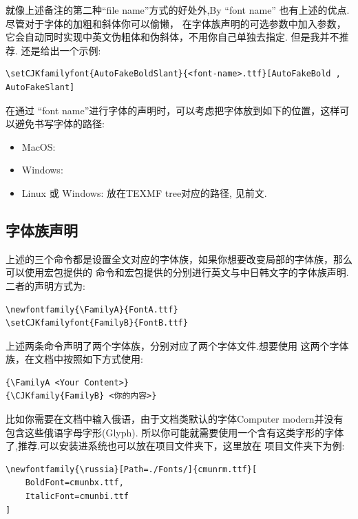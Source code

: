 \begin{remark}%
就像上述备注的第二种``file name''方式的好处外,By ``font name'' 也有上述的优点. 尽管对于字体的加粗和斜体你可以偷懒，
在字体族声明的可选参数中加入参数，它会自动同时实现中英文伪粗体和伪斜体，不用你自己单独去指定.
但是我并不推荐. 还是给出一个示例:
\end{remark}

\begin{verbatim}
\setCJKfamilyfont{AutoFakeBoldSlant}{<font-name>.ttf}[AutoFakeBold , AutoFakeSlant]
\end{verbatim}

在通过 ``font name''进行字体的声明时，可以考虑把字体放到如下的位置，这样可以避免书写字体的路径:
\begin{itemize}
    \item MacOS:
    \item Windows:
    \item Linux 或 Windows: 放在TEXMF tree对应的路径, 见前文.
\end{itemize}

\subsection{字体族声明}
上述的三个命令都是设置全文对应的字体族，如果你想要改变局部的字体族，那么可以使用宏包提供的
命令\cmd{\newfontfamily}和宏包提供的\cmd{\setCJKfamilyfont}分别进行英文与中日韩文字的字体族声明.
二者的声明方式为:
\begin{verbatim}
\newfontfamily{\FamilyA}{FontA.ttf}
\setCJKfamilyfont{FamilyB}{FontB.ttf}
\end{verbatim}

上述两条命令声明了两个字体族，分别对应了两个字体文件.想要使用
这两个字体族，在文档中按照如下方式使用:
\begin{verbatim}
{\FamilyA <Your Content>}
{\CJKfamily{FamilyB} <你的内容>}
\end{verbatim}

比如你需要在文档中输入俄语，由于文档类默认的字体Computer modern并没有包含这些俄语字母字形(Glyph).
所以你可能就需要使用一个含有这类字形的字体了,推荐.可以安装进系统也可以放在项目文件夹下，这里放在
项目文件夹下为例:
\begin{verbatim}
\newfontfamily{\russia}[Path=./Fonts/]{cmunrm.ttf}[
    BoldFont=cmunbx.ttf,
    ItalicFont=cmunbi.ttf
]
\end{verbatim}

